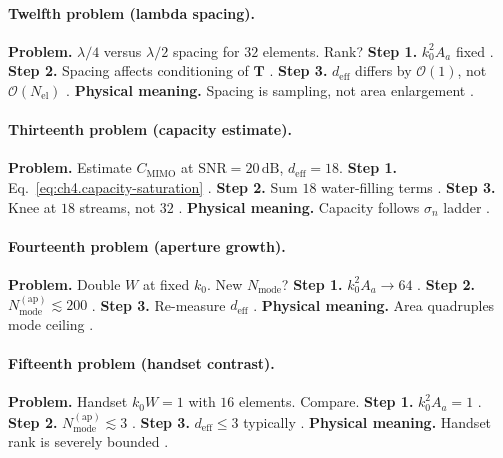 \paragraph{Twelfth problem (lambda spacing).}
\textbf{Problem.} \(\lambda/4\) versus \(\lambda/2\) spacing for \(32\) elements. Rank?
\textbf{Step 1.} \(k_{0}^{2}A_{a}\) fixed \cite{jackson1999,hansen1988,harrington2001,stratton1941,collin2001}.
\textbf{Step 2.} Spacing affects conditioning of \(\mathbf{T}\) \cite{devaney2004,harrington2001}.
\textbf{Step 3.} \(d_{\mathrm{eff}}\) differs by \(\mathcal{O}(1)\), not \(\mathcal{O}(N_{\mathrm{el}})\) \cite{hansen1988,jackson1999,stratton1941,collin2001}.
\textbf{Physical meaning.} Spacing is sampling, not area enlargement \cite{harrington2001,devaney2004}.

\paragraph{Thirteenth problem (capacity estimate).}
\textbf{Problem.} Estimate \(C_{\mathrm{MIMO}}\) at \(\mathrm{SNR}=20\,\mathrm{dB}\), \(d_{\mathrm{eff}}=18\).
\textbf{Step 1.} Eq.~\eqref{eq:ch4.capacity-saturation} \cite{harrington2001,devaney2004,hansen1988,jackson1999,collin2001,stratton1941}.
\textbf{Step 2.} Sum \(18\) water-filling terms \cite{harrington2001,stratton1941,devaney2004}.
\textbf{Step 3.} Knee at \(18\) streams, not \(32\) \cite{hansen1988,jackson1999,collin2001,harrington2001}.
\textbf{Physical meaning.} Capacity follows \(\sigma_{n}\) ladder \cite{stratton1941,devaney2004}.

\paragraph{Fourteenth problem (aperture growth).}
\textbf{Problem.} Double \(W\) at fixed \(k_{0}\). New \(N_{\mathrm{mode}}\)?
\textbf{Step 1.} \(k_{0}^{2}A_{a}\to64\) \cite{jackson1999,hansen1988,harrington2001,stratton1941,collin2001,devaney2004}.
\textbf{Step 2.} \(N_{\mathrm{mode}}^{\mathrm{(ap)}}\lesssim200\) \cite{harrington2001,stratton1941,devaney2004,hansen1988,jackson1999}.
\textbf{Step 3.} Re-measure \(d_{\mathrm{eff}}\) \cite{collin2001,harrington2001,jackson1999,stratton1941,devaney2004,hansen1988}.
\textbf{Physical meaning.} Area quadruples mode ceiling \cite{stratton1941,harrington2001,jackson1999}.

\paragraph{Fifteenth problem (handset contrast).}
\textbf{Problem.} Handset \(k_{0}W=1\) with \(16\) elements. Compare.
\textbf{Step 1.} \(k_{0}^{2}A_{a}=1\) \cite{jackson1999,hansen1988,harrington2001,stratton1941,collin2001}.
\textbf{Step 2.} \(N_{\mathrm{mode}}^{\mathrm{(ap)}}\lesssim3\) \cite{devaney2004,harrington2001,stratton1941,hansen1988,jackson1999}.
\textbf{Step 3.} \(d_{\mathrm{eff}}\le3\) typically \cite{collin2001,harrington2001,jackson1999,stratton1941,devaney2004,hansen1988}.
\textbf{Physical meaning.} Handset rank is severely bounded \cite{harrington2001,stratton1941,jackson1999}.

